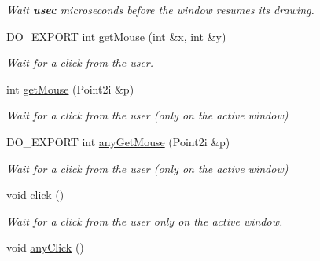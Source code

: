 \begin{DoxyCompactItemize}
\begin{DoxyCompactList}\small\item\em Wait {\bfseries usec} microseconds before the window resumes its drawing. \end{DoxyCompactList}\item 
D\-O\-\_\-\-E\-X\-P\-O\-R\-T int \hyperlink{group___window_management_ga5f65aa168357a4f932ac14bf3767af4f}{get\-Mouse} (int \&x, int \&y)
\begin{DoxyCompactList}\small\item\em Wait for a click from the user. \end{DoxyCompactList}\item 
int \hyperlink{group___window_management_gaa1b23139f5681ebfe40610f79e70de4b}{get\-Mouse} (Point2i \&p)
\begin{DoxyCompactList}\small\item\em Wait for a click from the user (only on the {\itshape active} window) \end{DoxyCompactList}\item 
D\-O\-\_\-\-E\-X\-P\-O\-R\-T int \hyperlink{group___window_management_gac4b8452beab69863b0ccba5a91b55983}{any\-Get\-Mouse} (Point2i \&p)
\begin{DoxyCompactList}\small\item\em Wait for a click from the user (only on the {\itshape active} window) \end{DoxyCompactList}\item 
\hypertarget{group___window_management_ga8330275bee3034e337eaeed23e2e49bf}{void \hyperlink{group___window_management_ga8330275bee3034e337eaeed23e2e49bf}{click} ()}\label{group___window_management_ga8330275bee3034e337eaeed23e2e49bf}

\begin{DoxyCompactList}\small\item\em Wait for a click from the user only on the {\itshape active} window. \end{DoxyCompactList}\item 
\hypertarget{group___window_management_ga0fda113cb57d325acd796bbb3bffc1e0}{void \hyperlink{group___window_management_ga0fda113cb57d325acd796bbb3bffc1e0}{any\-Click} ()}\label{group___window_management_ga0fda113cb57d325acd796bbb3bffc1e0}


\end{DoxyCompactItemize}

